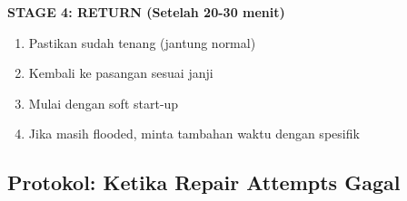 \begin{warningbox}
\textbf{STAGE 4: RETURN (Setelah 20-30 menit)}
\begin{enumerate}[itemsep=0.15cm]
    \item[$\square$] Pastikan sudah tenang (jantung normal)
    \item[$\square$] Kembali ke pasangan sesuai janji
    \item[$\square$] Mulai dengan soft start-up
    \item[$\square$] Jika masih flooded, minta tambahan waktu dengan spesifik
\end{enumerate}
\end{warningbox}

\subsection{Protokol: Ketika Repair Attempts Gagal}

